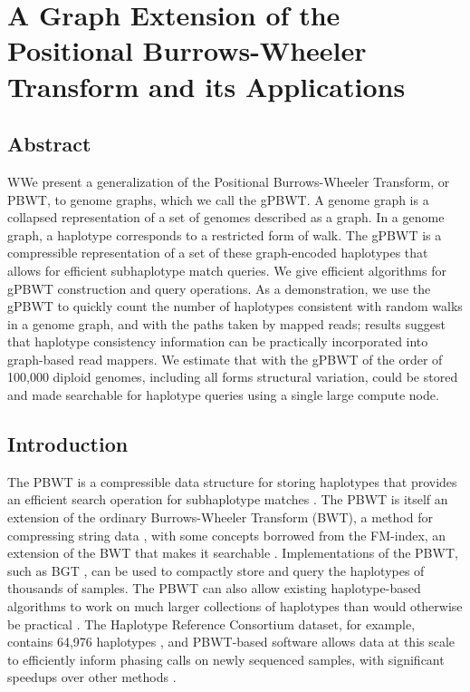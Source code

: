 \chapter{A Graph Extension of the Positional Burrows-Wheeler Transform and its Applications}

\section{Abstract}
WWe present a generalization of the Positional Burrows-Wheeler Transform, or PBWT, to genome graphs, which we call the gPBWT. A genome graph is a collapsed representation of a set of genomes described as a graph. In a genome graph, a haplotype corresponds to a restricted form of walk. The gPBWT is a compressible representation of a set of these graph-encoded haplotypes that allows for efficient subhaplotype match queries. We give efficient algorithms for gPBWT construction and query operations.
As a demonstration, we use the gPBWT to quickly count the number of haplotypes consistent with random walks in a genome graph, and with the paths taken by mapped reads; results suggest that haplotype consistency information can be practically incorporated into graph-based read mappers. We estimate that with the gPBWT of the order of 100,000 diploid genomes, including all forms structural variation, could be stored and made searchable for haplotype queries using a single large compute node.

\section{Introduction}

The PBWT is a compressible data structure for storing haplotypes that provides an efficient search operation for subhaplotype matches \cite{durbin2014efficient}. The PBWT is itself an extension of the ordinary Burrows-Wheeler Transform (BWT), a method for compressing string data \cite{burrows1994block}, with some concepts borrowed from the FM-index, an extension of the BWT that makes it searchable \cite{ferragina2000opportunistic}. Implementations of the PBWT, such as BGT \cite{li2015bgt}, can be used to compactly store and query the haplotypes of thousands of samples. The PBWT can also allow existing haplotype-based algorithms to work on much larger collections of haplotypes than would otherwise be practical \cite{lunter2016fast}. The Haplotype Reference Consortium dataset, for example, contains 64,976 haplotypes \cite{mccarthy2016reference}, and PBWT-based software allows data at this scale to efficiently inform phasing calls on newly sequenced samples, with significant speedups over other methods \cite{loh2016reference}.

